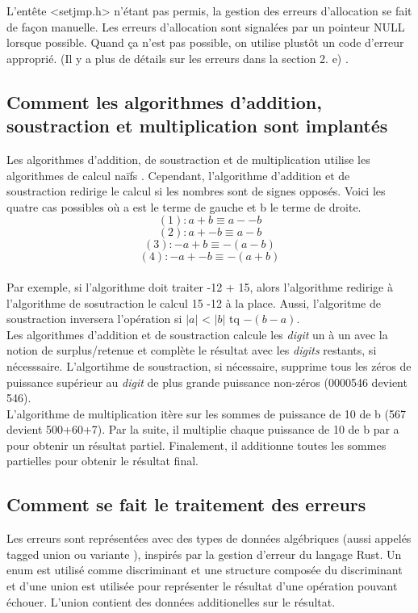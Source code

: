 \documentclass[a4paper,12pt,french]{article}
\begin{document}
		L'entête <setjmp.h> n'étant pas permis, la gestion des erreurs d'allocation se fait de
		façon manuelle. Les erreurs d'allocation sont signalées par un pointeur NULL lorsque
		possible. Quand ça n'est pas possible, on utilise plustôt un code d'erreur approprié.
		(Il y a plus de détails sur les erreurs dans la section 2. e) .\\
	\subsection{Comment les algorithmes d’addition, soustraction et multiplication sont implantés}
		Les algorithmes d'addition, de soustraction et de multiplication utilise les algorithmes de calcul \og naïfs \fg{}.
		Cependant, l'algorithme d'addition et de soustraction redirige le calcul si les nombres sont de signes opposés. Voici les quatre cas possibles où a est le terme de gauche et b le terme de droite.
		\[ (1) : a + b \equiv a - -b\]
		\[ (2) : a + -b \equiv a - b  \]
		\[ (3) : -a + b \equiv -(a-b) \]
		\[ (4) : -a + -b \equiv -(a+b) \]
		\\Par exemple, si l'algorithme doit traiter -12 + 15, alors l'algorithme redirige à l'algorithme de sosutraction le calcul 15 -12 à la place. Aussi, l'algoritme de soustraction inversera l'opération si $|a|$ < $|b|$ tq $-(b-a)$.\\

		Les algorithmes d'addition et de soustraction calcule les \textit{digit} un à un avec la notion de surplus/retenue et complète le résultat avec les \textit{digits} restants, si nécesssaire. L'algortihme de soustraction, si nécessaire, supprime tous les zéros de puissance supérieur au \textit{digit} de plus grande puissance non-zéros (0000546 devient 546).\\

		L'algorithme de multiplication itère sur les sommes de puissance de 10 de b (567 devient 500+60+7). Par la suite, il multiplie chaque puissance de 10 de b par a pour obtenir un résultat partiel. Finalement, il additionne toutes les sommes partielles pour obtenir le résultat final.
	\subsection{Comment se fait le traitement des erreurs}
		Les erreurs sont représentées avec des types de données algébriques (aussi appelés  \og tagged union \fg{}
		ou \og variante \fg{}), inspirés par la gestion d'erreur du langage Rust. Un enum est utilisé comme
		discriminant et une structure composée du discriminant et d'une union est utilisée pour représenter
		le résultat d'une opération pouvant échouer. L'union contient des données additionelles sur le
		résultat.\\
\end{document}
